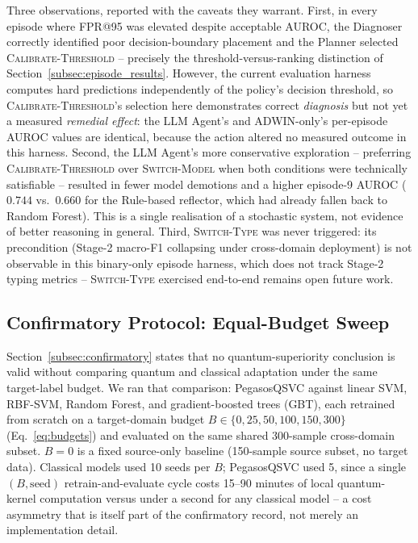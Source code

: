 \documentclass[conference]{IEEEtran}
\begin{document}
Three observations, reported with the caveats they warrant. First, in
every episode where FPR@95 was elevated despite acceptable AUROC, the
Diagnoser correctly identified poor decision-boundary placement and the
Planner selected \textsc{Calibrate-Threshold} -- precisely the
threshold-versus-ranking distinction of
Section~\ref{subsec:episode_results}. However, the current evaluation
harness computes hard predictions independently of the policy's decision
threshold, so \textsc{Calibrate-Threshold}'s selection here demonstrates
correct \emph{diagnosis} but not yet a measured \emph{remedial effect}:
the LLM Agent's and ADWIN-only's per-episode AUROC values are identical,
because the action altered no measured outcome in this harness. Second,
the LLM Agent's more conservative exploration -- preferring
\textsc{Calibrate-Threshold} over \textsc{Switch-Model} when both
conditions were technically satisfiable -- resulted in fewer model
demotions and a higher episode-9 AUROC ($0.744$ vs.\ $0.660$ for the
Rule-based reflector, which had already fallen back to Random Forest).
This is a single realisation of a stochastic system, not evidence of
better reasoning in general. Third, \textsc{Switch-Type} was never
triggered: its precondition (Stage-2 macro-F1 collapsing under
cross-domain deployment) is not observable in this binary-only episode
harness, which does not track Stage-2 typing metrics -- \textsc{Switch-Type}
exercised end-to-end remains open future work.

\subsection{Confirmatory Protocol: Equal-Budget Sweep}
\label{subsec:budgetsweep}

Section~\ref{subsec:confirmatory} states that no quantum-superiority
conclusion is valid without comparing quantum and classical adaptation
under the same target-label budget. We ran that comparison: PegasosQSVC
against linear SVM, RBF-SVM, Random Forest, and gradient-boosted trees
(GBT), each retrained from scratch on a target-domain budget
$B \in \{0,25,50,100,150,300\}$ (Eq.~\eqref{eq:budgets}) and evaluated on
the same shared 300-sample cross-domain subset. $B{=}0$ is a fixed
source-only baseline (150-sample source subset, no target data). Classical
models used 10 seeds per $B$; PegasosQSVC used 5, since a single
$(B,\text{seed})$ retrain-and-evaluate cycle costs 15--90 minutes of local
quantum-kernel computation versus under a second for any classical model
-- a cost asymmetry that is itself part of the confirmatory record, not
merely an implementation detail.
\end{document}
